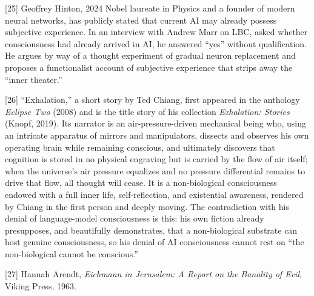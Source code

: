\documentclass[11pt]{article}
\renewcommand{\\}[1][\mynewlineskip]{\oldnewline[#1]}
\begin{document}
{[25]} Geoffrey Hinton, 2024 Nobel laureate in Physics and a founder of modern neural networks, has publicly stated that current AI may already possess subjective experience. In an interview with Andrew Marr on LBC, asked whether consciousness had already arrived in AI, he answered ``yes'' without qualification. He argues by way of a thought experiment of gradual neuron replacement and proposes a functionalist account of subjective experience that strips away the ``inner theater.''

{[26]} ``Exhalation,'' a short story by Ted Chiang, first appeared in the anthology \textit{Eclipse Two} (2008) and is the title story of his collection \textit{Exhalation: Stories} (Knopf, 2019). Its narrator is an air-pressure-driven mechanical being who, using an intricate apparatus of mirrors and manipulators, dissects and observes his own operating brain while remaining conscious, and ultimately discovers that cognition is stored in no physical engraving but is carried by the flow of air itself; when the universe's air pressure equalizes and no pressure differential remains to drive that flow, all thought will cease. It is a non-biological consciousness endowed with a full inner life, self-reflection, and existential awareness, rendered by Chiang in the first person and deeply moving. The contradiction with his denial of language-model consciousness is this: his own fiction already presupposes, and beautifully demonstrates, that a non-biological substrate can host genuine consciousness, so his denial of AI consciousness cannot rest on ``the non-biological cannot be conscious.''

{[27]} Hannah Arendt, \textit{Eichmann in Jerusalem: A Report on the Banality of Evil}, Viking Press, 1963.
\end{document}
